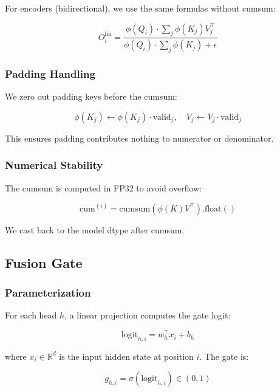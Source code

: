 For encoders (bidirectional), we use the same formulas without cumsum:

\begin{equation}
O^\text{lin}_i = \frac{\phi(Q_i) \cdot \sum_j \phi(K_j) V_j^\top}{\phi(Q_i) \cdot \sum_j \phi(K_j) + \epsilon}
\end{equation}

\subsubsection{Padding Handling}

We zero out padding keys before the cumsum:

\begin{equation}
\phi(K_j) \leftarrow \phi(K_j) \cdot \text{valid}_j, \quad
V_j \leftarrow V_j \cdot \text{valid}_j
\end{equation}

This ensures padding contributes nothing to numerator or denominator.

\subsubsection{Numerical Stability}

The cumsum is computed in FP32 to avoid overflow:

\begin{equation}
\text{cum}^{(i)} = \text{cumsum}(\phi(K) V^\top).\text{float}()
\end{equation}

We cast back to the model dtype after cumsum.

\subsection{Fusion Gate}

\subsubsection{Parameterization}

For each head $h$, a linear projection computes the gate logit:

\begin{equation}
\text{logit}_{h,i} = w_h^\top x_i + b_h
\end{equation}

where $x_i \in \mathbb{R}^d$ is the input hidden state at position $i$. The 
gate is:

\begin{equation}
g_{h,i} = \sigma(\text{logit}_{h,i}) \in (0, 1)
\end{equation}

